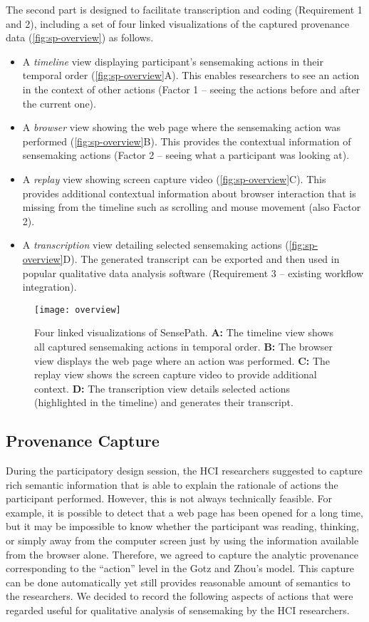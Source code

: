 The second part is designed to facilitate transcription and coding (Requirement 1 and 2), including a set of four linked visualizations of the captured provenance data (\autoref{fig:sp-overview}) as follows.

\begin{itemize}
\item A \emph{timeline} view displaying participant's sensemaking actions in their temporal order (\autoref{fig:sp-overview}A). This enables researchers to see an action in the context of other actions (Factor 1 -- seeing the actions before and after the current one).
\item A \emph{browser} view showing the web page where the sensemaking action was performed (\autoref{fig:sp-overview}B). This provides the contextual information of sensemaking actions (Factor 2 -- seeing what a participant was looking at).
\item A \emph{replay} view showing screen capture video (\autoref{fig:sp-overview}C). This provides additional contextual information about browser interaction that is missing from the timeline such as scrolling and mouse movement (also Factor 2).
\item A \emph{transcription} view detailing selected sensemaking actions (\autoref{fig:sp-overview}D). The generated transcript can be exported and then used in popular qualitative data analysis software (Requirement 3 -- existing workflow integration).
\end{itemize}

\begin{figure}[!htb]
 	\centering
 	\texttt{[image: overview]}
 	\caption{Four linked visualizations of SensePath. \textbf{A:} The timeline view shows all captured sensemaking actions in temporal order. \textbf{B:} The browser view displays the web page where an action was performed. \textbf{C:} The replay view shows the screen capture video to provide additional context. \textbf{D:} The transcription view details selected actions (highlighted in the timeline) and generates their transcript.}
 	\label{fig:sp-overview}
\end{figure}

\subsection{Provenance Capture}
\label{sub:sp-provenance}
During the participatory design session, the HCI researchers suggested to capture rich semantic  information that is able to explain the rationale of actions the participant performed. However, this is not always technically feasible. For example, it is possible to detect that a web page has been opened for a long time, but it may be impossible to know whether the participant was reading, thinking, or simply away from the computer screen just by using the information available from the browser alone. Therefore, we agreed to capture the analytic provenance corresponding to the ``action'' level in the Gotz and Zhou's model. This capture can be done automatically yet still provides reasonable amount of semantics to the researchers. We decided to record the following aspects of actions that were regarded useful for qualitative analysis of sensemaking by the HCI researchers.

